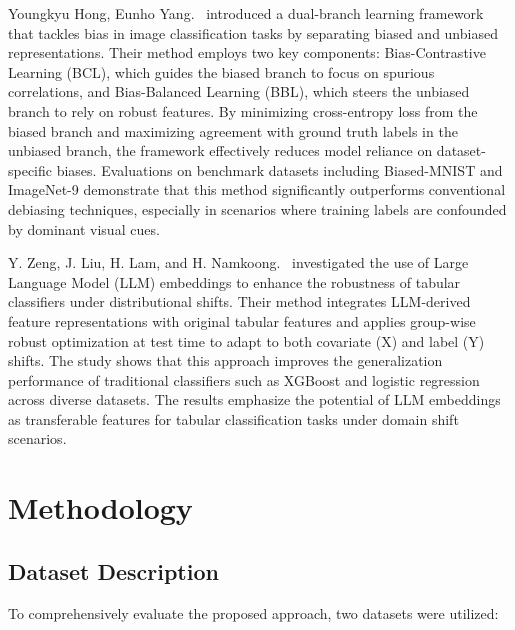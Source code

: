 \documentclass[conference]{IEEEtran}
\begin{document}
Youngkyu Hong, Eunho Yang.~\cite{b5} introduced a dual-branch learning framework that tackles bias in image classification tasks by separating biased and unbiased representations. Their method employs two key components: Bias-Contrastive Learning (BCL), which guides the biased branch to focus on spurious correlations, and Bias-Balanced Learning (BBL), which steers the unbiased branch to rely on robust features. By minimizing cross-entropy loss from the biased branch and maximizing agreement with ground truth labels in the unbiased branch, the framework effectively reduces model reliance on dataset-specific biases. Evaluations on benchmark datasets including Biased-MNIST and ImageNet-9 demonstrate that this method significantly outperforms conventional debiasing techniques, especially in scenarios where training labels are confounded by dominant visual cues.

Y. Zeng, J. Liu, H. Lam, and H. Namkoong.~\cite{b7} investigated the use of Large Language Model (LLM) embeddings to enhance the robustness of tabular classifiers under distributional shifts. Their method integrates LLM-derived feature representations with original tabular features and applies group-wise robust optimization at test time to adapt to both covariate (X) and label (Y) shifts. The study shows that this approach improves the generalization performance of traditional classifiers such as XGBoost and logistic regression across diverse datasets. The results emphasize the potential of LLM embeddings as transferable features for tabular classification tasks under domain shift scenarios.



\section{Methodology}
\subsection{Dataset Description}
To comprehensively evaluate the proposed approach, two datasets were utilized:
\end{document}
